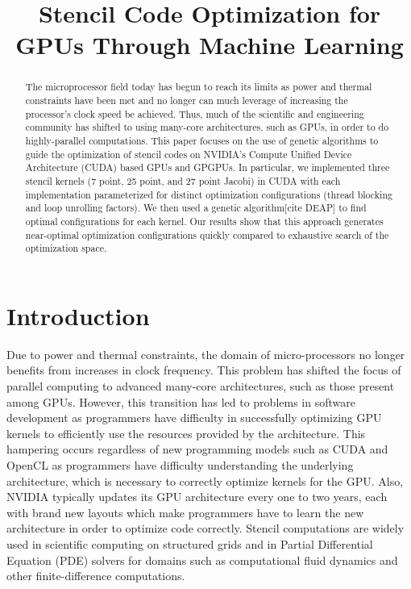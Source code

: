 \documentclass[conference]{IEEEtran}
\begin{document}


\title{Stencil Code Optimization for GPUs Through Machine Learning}
\author{
}
\maketitle

\begin{abstract}
	The microprocessor field today has begun to reach its limits as power and thermal constraints have been met and no longer can much leverage of increasing the processor's clock speed be achieved. Thus, much of the scientific and engineering community has shifted to using many-core architectures, such as GPUs, in order to do highly-parallel computations. This paper focuses on the use of genetic algorithms to guide the optimization of stencil codes on NVIDIA's Compute Unified Device Architecture (CUDA) based GPUs and GPGPUs. In particular, we implemented three stencil kernels (7 point, 25 point, and 27 point Jacobi) in CUDA with each implementation parameterized for distinct optimization configurations (thread blocking and loop unrolling factors). We then used a genetic algorithm[cite DEAP] to find optimal configurations for each kernel. Our results show that this approach generates near-optimal optimization configurations quickly compared to exhaustive search of the optimization space.
\end{abstract}

\section{Introduction}
	Due to power and thermal constraints, the domain of micro-processors no longer benefits from increases in clock frequency\cite{Datta}. This problem has shifted the focus of parallel computing to advanced many-core architectures, such as those present among GPUs. However, this transition has led to problems in software development as programmers have difficulty in successfully optimizing GPU kernels to efficiently use the resources provided by the architecture. This hampering occurs regardless of new programming models such as CUDA and OpenCL as programmers have difficulty understanding the underlying architecture, which is necessary to correctly optimize kernels for the GPU\cite{Zhang}. Also, NVIDIA typically updates its GPU architecture every one to two years, each with brand new layouts which make programmers have to learn the new architecture in order to optimize code correctly. Stencil computations are widely used in scientific computing on structured grids and in Partial Differential Equation (PDE) solvers for domains such as computational fluid dynamics and other finite-difference computations\cite{Mici, Nguy, Jaeger, Datta, Gana, Zhang, NVIDIA}.
\end{document}
